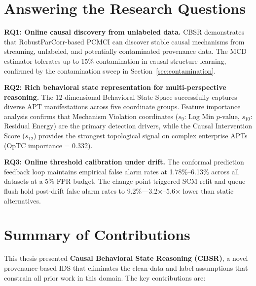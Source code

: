 \section{Answering the Research Questions}

\textbf{RQ1: Online causal discovery from unlabeled data.}
CBSR demonstrates that RobustParCorr-based PCMCI can discover stable causal mechanisms from
streaming, unlabeled, and potentially contaminated provenance data. The MCD estimator tolerates
up to 15\% contamination in causal structure learning, confirmed by the contamination sweep in
Section~\ref{sec:contamination}.

\textbf{RQ2: Rich behavioral state representation for multi-perspective reasoning.}
The 12-dimensional Behavioral State Space successfully captures diverse APT manifestations across
five coordinate groups. Feature importance analysis confirms that Mechanism Violation coordinates
($s_9$: Log Min $p$-value, $s_{10}$: Residual Energy) are the primary detection drivers, while
the Causal Intervention Score ($s_{12}$) provides the strongest topological signal on complex
enterprise APTs (OpTC importance = 0.332).

\textbf{RQ3: Online threshold calibration under drift.}
The conformal prediction feedback loop maintains empirical false alarm rates at 1.78\%--6.13\%
across all datasets at a 5\% FPR budget. The change-point-triggered SCM refit and queue flush
hold post-drift false alarm rates to 9.2\%---3.2$\times$--5.6$\times$ lower than static
alternatives.


\section{Summary of Contributions}

This thesis presented \textbf{Causal Behavioral State Reasoning (CBSR)}, a novel
provenance-based IDS that eliminates the clean-data and label assumptions that constrain all
prior work in this domain. The key contributions are:

